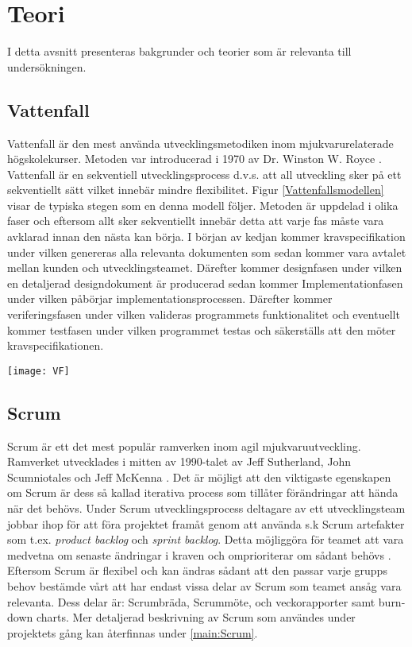 \section{Teori} \label{sec:Lieth_Wahid-theory}
I detta avsnitt presenteras bakgrunder och teorier som är relevanta till undersökningen. 
\subsection{Vattenfall}
Vattenfall är den mest använda utvecklingsmetodiken inom mjukvarurelaterade högskolekurser. Metoden var introducerad i 1970 \cite{WaterfalM} av Dr. Winston W. Royce \cite{royce1987managing}. Vattenfall är en sekventiell utvecklingsprocess d.v.s. att all utveckling sker på ett sekventiellt sätt vilket innebär mindre flexibilitet. Figur \ref{Vattenfallsmodellen} visar de typiska 
stegen som en denna modell följer. Metoden är uppdelad i olika faser och eftersom allt sker sekventiellt innebär detta att varje fas måste vara avklarad innan den nästa kan börja.  I början av kedjan kommer kravspecifikation under vilken genereras alla relevanta dokumenten som sedan kommer vara avtalet mellan kunden och utvecklingsteamet\cite{ASEEPEER95:online,}. Därefter kommer designfasen under vilken en detaljerad designdokument är producerad sedan kommer Implementationfasen under vilken påbörjar implementationsprocessen. Därefter kommer veriferingsfasen under vilken valideras programmets funktionalitet och eventuellt kommer testfasen under vilken programmet testas och säkerställs att den möter kravspecifikationen.
\begin{figure*}[h]
	\centering
	\texttt{[image: VF]}
	\caption{Vattenfallsmodellen}
	\label{Vattenfallsmodellen}
\end{figure*}
\subsection{Scrum}
Scrum är ett det mest populär ramverken inom agil mjukvaruutveckling. Ramverket utvecklades i mitten av 1990-talet av Jeff Sutherland, John Scumniotales och Jeff McKenna \cite{AgileToo72:online}. Det är möjligt att den viktigaste egenskapen om Scrum är dess så kallad iterativa process som tillåter förändringar att hända när det behövs. Under Scrum utvecklingsprocess deltagare av ett utvecklingsteam jobbar ihop för att föra projektet framåt genom att använda s.k Scrum artefakter som t.ex. \textit{product backlog} och \textit{sprint backlog}. Detta möjliggöra för teamet att vara medvetna om senaste ändringar i kraven och omprioriterar om sådant behövs \cite{aamir2017incorporating}. Eftersom Scrum är flexibel och kan ändras sådant att den passar varje grupps behov bestämde vårt att har endast vissa delar av Scrum som teamet ansåg vara relevanta. Dess delar är:
Scrumbräda, Scrummöte, och veckorapporter samt burn-down charts. Mer detaljerad beskrivning av Scrum som användes under projektets gång kan återfinnas under \ref{main:Scrum}.

